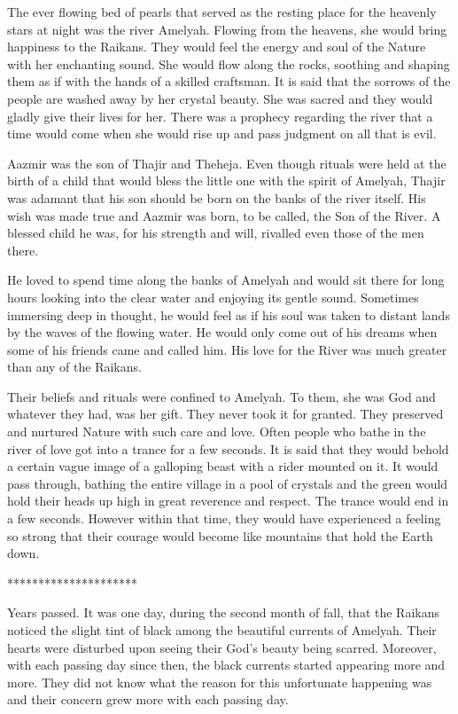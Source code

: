 \documentclass[twoside,11pt,titlepage]{article}
\begin{document}
The ever flowing bed of pearls that served as the resting place for the heavenly stars at night was the river Amelyah. Flowing from the heavens, she would bring happiness to the Raikans. They would feel the energy and soul of the Nature with her enchanting sound. She would flow along the rocks, soothing and shaping them as if with the hands of a skilled craftsman. It is said that the sorrows of the people are washed away by her crystal beauty. She was sacred and they would gladly give their lives for her. There was a prophecy regarding the river that a time would come when she would rise up and pass judgment on all that is evil.

Aazmir was the son of Thajir and Theheja. Even though rituals were held at the birth of a child that would bless the little one with the spirit of Amelyah, Thajir was adamant that his son should be born on the banks of the river itself. His wish was made true and Aazmir was born, to be called, the Son of the River. A blessed child he was, for his strength and will, rivalled even those of the men there.

He loved to spend time along the banks of Amelyah and would sit there for long hours looking into the clear water and enjoying its gentle sound. Sometimes immersing deep in thought, he would feel as if his soul was taken to distant lands by the waves of the flowing water. He would only come out of his dreams when some of his friends came and called him. His love for the River was much greater than any of the Raikans.

Their beliefs and rituals were confined to Amelyah. To them, she was God and whatever they had, was her gift. They never took it for granted. They preserved and nurtured Nature with such care and love. Often people who bathe in the river of love got into a trance for a few seconds. It is said that they would behold a certain vague image of a galloping beast with a rider mounted on it. It would pass through, bathing the entire village in a pool of crystals and the green would hold their heads up high in great reverence and respect. The trance would end in a few seconds. However within that time, they would have experienced a feeling so strong that their courage would become like mountains that hold the Earth down.

\bigskip
\begin{center}
*********************
\end{center}

Years passed. It was one day, during the second month of fall, that the Raikans noticed the slight tint of black among the beautiful currents of Amelyah. Their hearts were disturbed upon seeing their God's beauty being scarred. Moreover, with each passing day since then, the black currents started appearing more and more. They did not know what the reason for this unfortunate happening was and their concern grew more with each passing day.
\end{document}
